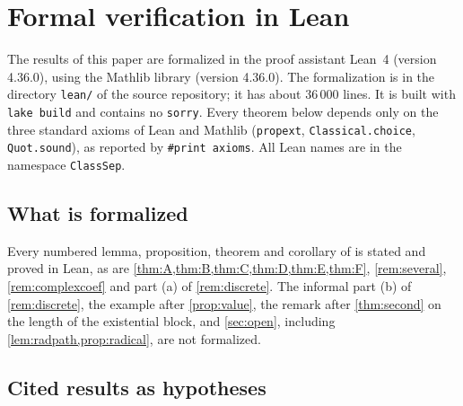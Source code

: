 \section{Formal verification in Lean}\label{sec:lean}
\begingroup\raggedright

The results of this paper are formalized in the proof assistant Lean~4 (version 4.36.0), using the Mathlib library (version 4.36.0). The formalization is in the directory \texttt{lean/} of the source repository; it has about 36\,000 lines. It is built with \texttt{lake build} and contains no \texttt{sorry}. Every theorem below depends only on the three standard axioms of Lean and Mathlib (\texttt{propext}, \texttt{Classical.choice}, \texttt{Quot.sound}), as reported by \texttt{\#print axioms}. All Lean names are in the namespace \texttt{ClassSep}.

\subsection{What is formalized}

Every numbered lemma, proposition, theorem and corollary of  is stated and proved in Lean, as are \cref{thm:A,thm:B,thm:C,thm:D,thm:E,thm:F}, \cref{rem:several}, \cref{rem:complexcoef} and part (a) of \cref{rem:discrete}. The informal part (b) of \cref{rem:discrete}, the example after \cref{prop:value}, the remark after \cref{thm:second} on the length of the existential block, and \cref{sec:open}, including \cref{lem:radpath,prop:radical}, are not formalized.

\subsection{Cited results as hypotheses}

